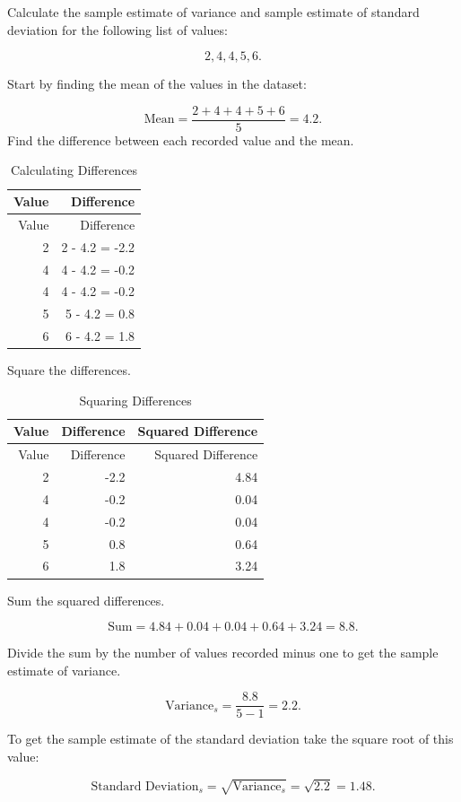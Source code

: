 \documentclass[
]{book}
\begin{document}
Calculate the sample estimate of variance and sample estimate of standard deviation for the following list of values:

\[ 2, 4, 4, 5, 6.\]

Start by finding the mean of the values in the dataset:

\[ \textrm{Mean}= \frac{2 + 4 + 4 + 5 + 6}{5}=4.2.\]
Find the difference between each recorded value and the mean.

\begin{longtable}[]{@{}rr@{}}
\caption{\label{tab:table8} Calculating Differences}\tabularnewline
\toprule
Value & Difference \\
\midrule
\endfirsthead
\toprule
Value & Difference \\
\midrule
\endhead
2 & 2 - 4.2 = -2.2 \\
4 & 4 - 4.2 = -0.2 \\
4 & 4 - 4.2 = -0.2 \\
5 & 5 - 4.2 = 0.8 \\
6 & 6 - 4.2 = 1.8 \\
\bottomrule
\end{longtable}

Square the differences.

\begin{longtable}[]{@{}rrr@{}}
\caption{\label{tab:table9} Squaring Differences}\tabularnewline
\toprule
Value & Difference & Squared Difference \\
\midrule
\endfirsthead
\toprule
Value & Difference & Squared Difference \\
\midrule
\endhead
2 & -2.2 & 4.84 \\
4 & -0.2 & 0.04 \\
4 & -0.2 & 0.04 \\
5 & 0.8 & 0.64 \\
6 & 1.8 & 3.24 \\
\bottomrule
\end{longtable}

Sum the squared differences.

\[\textrm{Sum} = 4.84 + 0.04 + 0.04 + 0.64 + 3.24 = 8.8. \]

Divide the sum by the number of values recorded minus one to get the sample estimate of variance.

\[ \textrm{Variance}_{s} = \frac{8.8}{5-1} = 2.2.\]

To get the sample estimate of the standard deviation take the square root of this value:

\[ \textrm{Standard Deviation}_s = \sqrt{ \textrm{Variance}_{s}} = \sqrt{2.2} = 1.48.\]
\end{document}
